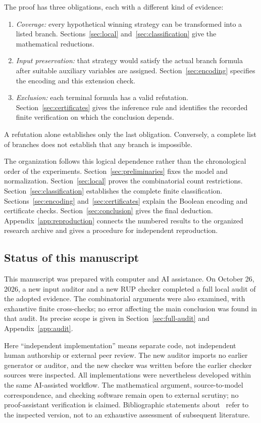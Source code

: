 The proof has three obligations, each with a different kind of evidence:
\begin{enumerate}
\item \emph{Coverage:} every hypothetical winning strategy can be
transformed into a listed branch. Sections~\ref{sec:local}
and~\ref{sec:classification} give the mathematical reductions.
\item \emph{Input preservation:} that strategy would satisfy the actual
branch formula after suitable auxiliary variables are assigned.
Section~\ref{sec:encoding} specifies the encoding and this extension check.
\item \emph{Exclusion:} each terminal formula has a valid refutation.
Section~\ref{sec:certificates} gives the inference rule and identifies the
recorded finite verification on which the conclusion depends.
\end{enumerate}
A refutation alone establishes only the last obligation. Conversely, a
complete list of branches does not establish that any branch is impossible.

The organization follows this logical dependence rather than the
chronological order of the experiments. Section~\ref{sec:preliminaries}
fixes the model and normalization. Section~\ref{sec:local} proves the
combinatorial count restrictions. Section~\ref{sec:classification}
establishes the complete finite classification.
Sections~\ref{sec:encoding} and~\ref{sec:certificates} explain the Boolean
encoding and certificate checks. Section~\ref{sec:conclusion} gives the
final deduction. Appendix~\ref{app:reproduction} connects the numbered
results to the organized research archive and gives a procedure for
independent reproduction.

\subsection*{Status of this manuscript}
This manuscript was prepared with computer and AI assistance. On
October 26, 2026, a new input auditor and a new RUP checker completed a
full local audit of the adopted evidence. The combinatorial arguments
were also examined, with exhaustive finite cross-checks; no error
affecting the main conclusion was found in that audit. Its precise scope
is given in Section~\ref{sec:full-audit} and Appendix~\ref{app:audit}.

Here ``independent implementation'' means separate code, not independent
human authorship or external peer review. The new auditor imports no
earlier generator or auditor, and the new checker was written before
the earlier checker sources were inspected. All implementations were
nevertheless developed within the same AI-assisted workflow. The
mathematical argument, source-to-model correspondence, and checking
software remain open to external scrutiny; no proof-assistant
verification is claimed. Bibliographic statements about~\cite{proper}
refer to the inspected version, not to an exhaustive assessment of
subsequent literature.

